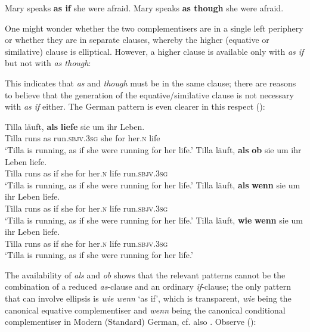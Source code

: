\ea
\ea Mary speaks \textbf{as if} she were afraid.
\ex Mary speaks \textbf{as though} she were afraid.
\z
\z

One might wonder whether the two complementisers are in a single left periphery or whether they are in separate clauses, whereby the higher (equative or similative) clause is elliptical. However, a higher clause is available only with \textit{as if} but not with \textit{as though}:

\ea
{}
\z
\z

This indicates that \textit{as} and \textit{though} must be in the same clause; there are reasons to believe that the generation of the equative/similative clause is not necessary with \textit{as if} either. The German pattern is even clearer in this respect (\citealt[469, ex. 4]{jaeger2010}):

\ea \label{irrealcomps}
\ea \gll Tilla läuft, \textbf{als} \textbf{liefe} sie um ihr Leben. \label{alsliefe}\\
Tilla runs as run.\textsc{sbjv.3sg} she for her.\textsc{n} life\\
\glt `Tilla is running, as if she were running for her life.'
\ex \gll Tilla läuft, \textbf{als} \textbf{ob} sie um ihr Leben liefe. \label{alsob}\\
Tilla runs as if she for her.\textsc{n} life run.\textsc{sbjv.3sg}\\
\glt `Tilla is running, as if she were running for her life.'
\ex \gll Tilla läuft, \textbf{als} \textbf{wenn} sie um ihr Leben liefe. \label{alswenn}\\
Tilla	runs as if she for her.\textsc{n} life run.\textsc{sbjv.3sg}\\
\glt `Tilla is running, as if she were running for her life.'
\ex \gll Tilla läuft, \textbf{wie} \textbf{wenn} sie um ihr Leben liefe.\\
Tilla runs as if she for her.\textsc{n} life run.\textsc{sbjv.3sg}\\
\glt `Tilla is running, as if she were running for her life.'
\z
\z

The availability of \textit{als} and \textit{ob} shows that the relevant patterns cannot be the combination of a reduced \textit{as}-clause and an ordinary \textit{if}-clause; the only pattern that can involve ellipsis is \textit{wie wenn} `as if', which is transparent, \textit{wie} being the canonical equative complementiser and \textit{wenn} being the canonical conditional complementiser in Modern (Standard) German,	cf. also \citet{jaeger2010}. Observe (\citealt[487, ex. 43 and 45a]{jaeger2010}):

